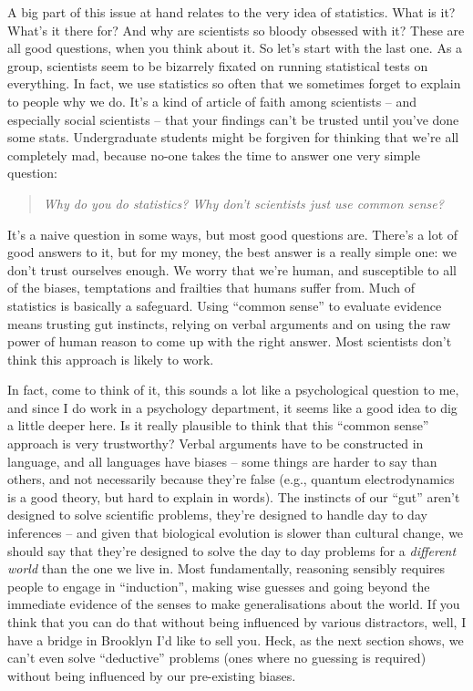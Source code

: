 \documentclass[
]{book}
\begin{document}
A big part of this issue at hand relates to the very idea of statistics. What is it? What's it there for? And why are scientists so bloody obsessed with it? These are all good questions, when you think about it. So let's start with the last one. As a group, scientists seem to be bizarrely fixated on running statistical tests on everything. In fact, we use statistics so often that we sometimes forget to explain to people why we do. It's a kind of article of faith among scientists -- and especially social scientists -- that your findings can't be trusted until you've done some stats. Undergraduate students might be forgiven for thinking that we're all completely mad, because no-one takes the time to answer one very simple question:

\begin{quote}
\emph{Why do you do statistics? Why don't scientists just use common sense?}
\end{quote}

It's a naive question in some ways, but most good questions are. There's a lot of good answers to it, but for my money, the best answer is a really simple one: we don't trust ourselves enough. We worry that we're human, and susceptible to all of the biases, temptations and frailties that humans suffer from. Much of statistics is basically a safeguard. Using ``common sense'' to evaluate evidence means trusting gut instincts, relying on verbal arguments and on using the raw power of human reason to come up with the right answer. Most scientists don't think this approach is likely to work.

In fact, come to think of it, this sounds a lot like a psychological question to me, and since I do work in a psychology department, it seems like a good idea to dig a little deeper here. Is it really plausible to think that this ``common sense'' approach is very trustworthy? Verbal arguments have to be constructed in language, and all languages have biases -- some things are harder to say than others, and not necessarily because they're false (e.g., quantum electrodynamics is a good theory, but hard to explain in words). The instincts of our ``gut'' aren't designed to solve scientific problems, they're designed to handle day to day inferences -- and given that biological evolution is slower than cultural change, we should say that they're designed to solve the day to day problems for a \emph{different world} than the one we live in. Most fundamentally, reasoning sensibly requires people to engage in ``induction'', making wise guesses and going beyond the immediate evidence of the senses to make generalisations about the world. If you think that you can do that without being influenced by various distractors, well, I have a bridge in Brooklyn I'd like to sell you. Heck, as the next section shows, we can't even solve ``deductive'' problems (ones where no guessing is required) without being influenced by our pre-existing biases.
\end{document}
